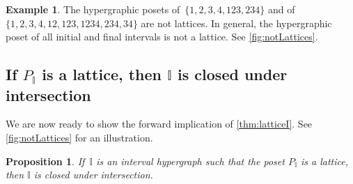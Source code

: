 \documentclass{amsart}
\newtheorem{proposition}[theorem]{Proposition}
\theoremstyle{definition}
\newtheorem{example}[theorem]{Example}
\newcommand{\II}{\mathbb I} %
\begin{document}
\begin{example}
The hypergraphic posets of~$\{1, 2, 3, 4, 123, 234\}$ and of~$\{ 1, 2, 3, 4, 12, 123, 1234, 234, 34\}$ are not lattices.
In general, the hypergraphic poset of all initial and final intervals is not a lattice.
See \cref{fig:notLattices}.
\end{example}


\subsection{If $P_\II$ is a lattice, then $\II$ is closed under intersection}  
\label{subsec:latticeForward}

We are now ready to show the forward implication of \cref{thm:latticeI}.
See \cref{fig:notLattices} for an illustration.

\begin{proposition}
\label{prop:latticeForward}
If~$\II$ is an interval  hypergraph such that the poset $P_\II$ is a lattice, then $\II$ is closed under intersection.
\end{proposition}
\end{document}
